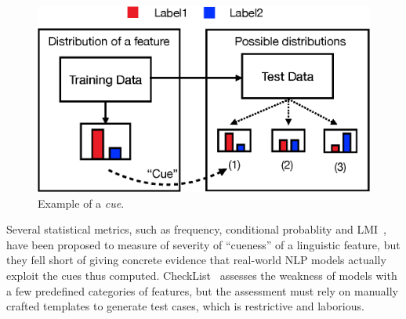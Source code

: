 %
%
%

\begin{figure}[th]
\centering
\includegraphics[width=0.8\columnwidth]{picture/cue_def.eps}
\caption{Example of a \textit{cue}.} 
\label{fig:cue_def}
\end{figure}

Several statistical metrics, such as frequency, conditional probablity and
LMI~\cite{schuster2019towards}, have been proposed to measure of 
severity of ``cueness'' of a linguistic feature, 
but they fell short of giving concrete evidence that
real-world NLP models actually exploit the cues thus computed. CheckList~\cite{checklist2020acl} assesses the weakness of 
models with a few predefined categories of features, but the assessment must rely on
manually crafted templates to generate test cases, which is restrictive and laborious.

